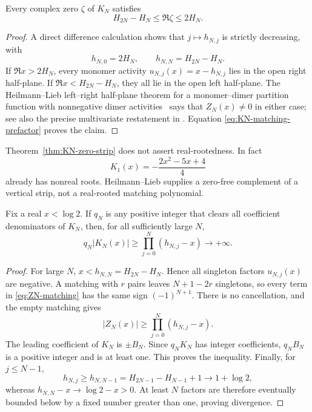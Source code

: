 \begin{theorem}
\label{thm:KN-zero-strip}
Every complex zero \(\zeta\) of \(K_N\) satisfies
\begin{equation}
 \boxed{H_{2N}-H_N\leq\Re\zeta\leq2H_N.}
 \label{eq:KN-zero-strip}
\end{equation}
\end{theorem}

\begin{proof}
A direct difference calculation shows that \(j\mapsto h_{N,j}\) is strictly
decreasing, with
\[
 h_{N,0}=2H_N,
 \qquad
 h_{N,N}=H_{2N}-H_N.
\]
If \(\Re x>2H_N\), every monomer activity
\(u_{N,j}(x)=x-h_{N,j}\) lies in the open right half-plane.  If
\(\Re x<H_{2N}-H_N\), they all lie in the open left half-plane.  The
Heilmann--Lieb left--right half-plane theorem for a monomer--dimer partition
function with nonnegative dimer activities~\cite[Theorem~4.6 and
Lemma~4.7]{HeilmannLieb1972} says that \(Z_N(x)\neq0\) in either case; see also
the precise multivariate restatement in
\cite[Theorem~10.1]{ChoeOxleySokalWagner2004}.  Equation
\eqref{eq:KN-matching-prefactor} proves the claim.
\end{proof}

\begin{remark}
Theorem~\ref{thm:KN-zero-strip} does not assert real-rootedness.  In fact
\[
 K_1(x)=-\frac{2x^2-5x+4}{4}
\]
already has nonreal roots.  Heilmann--Lieb supplies a zero-free complement of
a vertical strip, not a real-rooted matching polynomial.
\end{remark}

\begin{proposition}
\label{prop:KN-divergence}
Fix a real \(x<\log2\).  If \(q_N\) is any positive integer that clears all
coefficient denominators of \(K_N\), then, for all sufficiently large \(N\),
\begin{equation}
 q_N|K_N(x)|
 \geq\prod_{j=0}^N(h_{N,j}-x)
 \longrightarrow+\infty.
 \label{eq:KN-cleared-divergence}
\end{equation}
\end{proposition}

\begin{proof}
For large \(N\), \(x<h_{N,N}=H_{2N}-H_N\).  Hence all singleton factors
\(u_{N,j}(x)\) are negative.  A matching with \(r\) pairs leaves
\(N+1-2r\) singletons, so every term in \eqref{eq:ZN-matching} has the same
sign \((-1)^{N+1}\).  There is no cancellation, and the empty matching gives
\[
 |Z_N(x)|\geq\prod_{j=0}^N(h_{N,j}-x).
\]
The leading coefficient of \(K_N\) is \(\pm B_N\).  Since \(q_NK_N\) has
integer coefficients, \(q_NB_N\) is a positive integer and is at least one.
This proves the inequality.  Finally, for \(j\leq N-1\),
\[
 h_{N,j}\geq h_{N,N-1}
 =H_{2N-1}-H_{N-1}+1\longrightarrow1+\log2,
\]
whereas \(h_{N,N}-x\to\log2-x>0\).  At least \(N\) factors are therefore
eventually bounded below by a fixed number greater than one, proving
divergence.
\end{proof}

